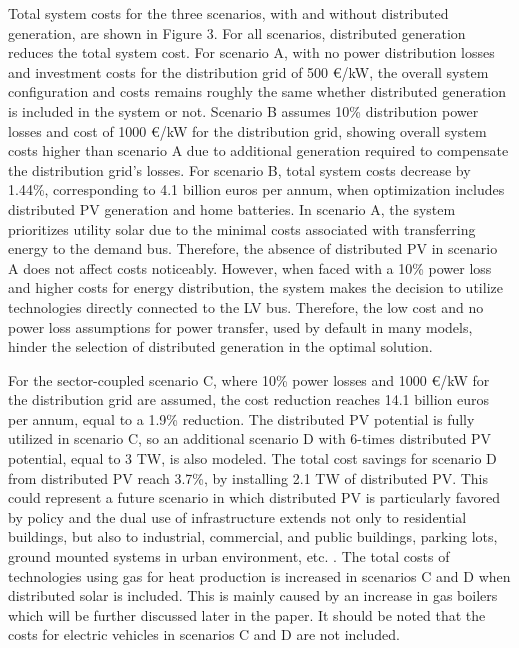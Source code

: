 \documentclass[review]{elsarticle}
\begin{document}
Total system costs for the three scenarios, with and without distributed generation, are shown in Figure 3. For all scenarios, distributed generation reduces the total system cost. For scenario A, with no power distribution losses and investment costs for the distribution grid of 500 €/kW, the overall system configuration and costs remains roughly the same whether distributed generation is included in the system or not. Scenario B assumes 10\% distribution power losses and cost of 1000 €/kW for the distribution grid, showing overall system costs higher than scenario A due to additional generation required to compensate the distribution grid's losses. For scenario B, total system costs decrease by 1.44\%, corresponding to 4.1 billion euros per annum, when optimization includes distributed PV generation and home batteries. In scenario A, the system prioritizes utility solar due to the minimal costs associated with transferring energy to the demand bus. Therefore, the absence of distributed PV in scenario A does not affect costs noticeably. However, when faced with a 10\% power loss and higher costs for energy distribution, the system makes the decision to utilize technologies directly connected to the LV bus. Therefore, the low cost and no power loss assumptions for power transfer, used by default in many models, hinder the selection of distributed generation in the optimal solution.

For the sector-coupled scenario C, where 10\% power losses and 1000 €/kW for the distribution grid are assumed, the cost reduction reaches 14.1 billion euros per annum, equal to a 1.9\% reduction. The distributed PV potential is fully utilized in scenario C, so an additional scenario D with 6-times distributed PV potential, equal to 3 TW, is also modeled. The total cost savings for scenario D from distributed PV reach 3.7\%, by installing 2.1 TW of distributed PV. This could represent a future scenario in which distributed PV is particularly favored by policy and the dual use of infrastructure extends not only to residential buildings, but also to industrial, commercial, and public buildings, parking lots, ground mounted systems in urban environment, etc. \cite{trondle_2019, France_senate2022}. The total costs of technologies using gas for heat production is increased in scenarios C and D when distributed solar is included. This is mainly caused by an increase in gas boilers which will be further discussed later in the paper. It should be noted that the costs for electric vehicles in scenarios C and D are not included.
\end{document}
